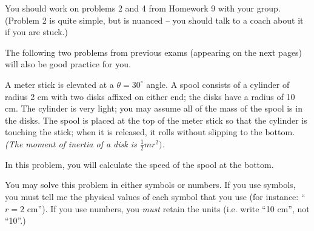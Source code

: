 \documentclass[12pt]{article}
\begin{document}
\Large
\centerline{}
\normalsize
\centerline{}

You should work on problems 2 and 4 from Homework 9 with your group. (Problem 2 is quite simple, but is nuanced -- you should talk to a coach about it if you are stuck.) 

The following two problems from previous exams (appearing on the next pages) will also be good practice for you.


\newpage


A meter stick is elevated at a $\theta=30^\circ$ angle. A spool consists of a cylinder of radius 2 cm with two disks affixed on either end; the disks have a
radius of 10 cm. The cylinder is very light; you may assume all of the mass of the spool is in the disks. The spool is placed at the top of the meter stick
so that the cylinder is touching the stick; when it is released, it rolls without slipping to the bottom. \it (The moment of inertia of a disk is $\frac{1}{2}mr^2)$. \rm

In this problem, you will calculate the speed of the spool at the bottom.

\small

You may solve this problem in either symbols or numbers.
If you use symbols, you must tell me the physical values of each symbol that you use (for instance: ``$r=2$ cm''). If you use numbers, you {\it must} retain the
units (i.e. write ``10 cm'', not ``10''.)

\normalsize\bigskip\bigskip
\end{document}
